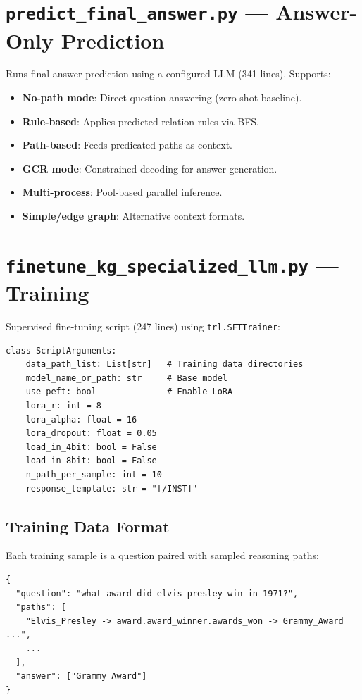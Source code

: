 \documentclass[11pt,a4paper,oneside,openany]{book}
\theoremstyle{definition}
\newcommand{\code}[1]{\texttt{#1}}
\begin{document}
\section{\texttt{predict\_final\_answer.py} --- Answer-Only Prediction}

Runs final answer prediction using a configured LLM (341 lines). Supports:
\begin{itemize}
	\item \textbf{No-path mode}: Direct question answering (zero-shot baseline).
	\item \textbf{Rule-based}: Applies predicted relation rules via BFS.
	\item \textbf{Path-based}: Feeds predicated paths as context.
	\item \textbf{GCR mode}: Constrained decoding for answer generation.
	\item \textbf{Multi-process}: Pool-based parallel inference.
	\item \textbf{Simple/edge graph}: Alternative context formats.
\end{itemize}

\section{\texttt{finetune\_kg\_specialized\_llm.py} --- Training}

Supervised fine-tuning script (247 lines) using \code{trl.SFTTrainer}:

\begin{lstlisting}
class ScriptArguments:
    data_path_list: List[str]   # Training data directories
    model_name_or_path: str     # Base model
    use_peft: bool              # Enable LoRA
    lora_r: int = 8
    lora_alpha: float = 16
    lora_dropout: float = 0.05
    load_in_4bit: bool = False
    load_in_8bit: bool = False
    n_path_per_sample: int = 10
    response_template: str = "[/INST]"
\end{lstlisting}

\subsection{Training Data Format}

Each training sample is a question paired with sampled reasoning paths:

\begin{lstlisting}[numbers=none]
{
  "question": "what award did elvis presley win in 1971?",
  "paths": [
    "Elvis_Presley -> award.award_winner.awards_won -> Grammy_Award ...",
    ...
  ],
  "answer": ["Grammy Award"]
}
\end{lstlisting}
\end{document}
